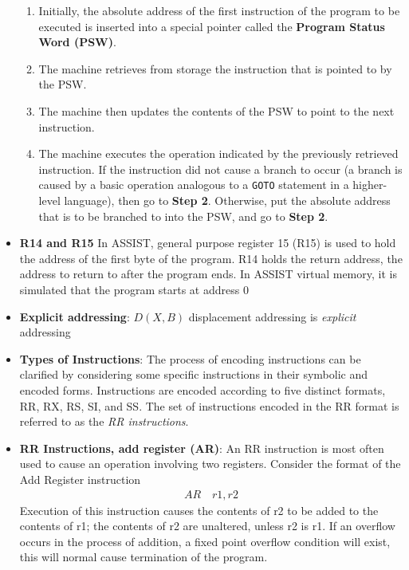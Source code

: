 \documentclass{report}
\begin{document}
\begin{itemize}
\begin{enumerate}
                         \item Initially, the absolute address of the first instruction of the program to be executed is inserted into a special pointer called the \textbf{Program Status Word (PSW)}.
                         \item The machine retrieves from storage the instruction that is pointed to by the PSW.
                         \item The machine then updates the contents of the PSW to point to the next instruction.
                         \item The machine executes the operation indicated by the previously retrieved instruction. If the instruction did not cause a branch to occur (a branch is caused by a basic operation analogous to a \texttt{GOTO} statement in a higher-level language), then go to \textbf{Step 2}. Otherwise, put the absolute address that is to be branched to into the PSW, and go to \textbf{Step 2}.
                    \end{enumerate}
                    \bigbreak \noindent 
                \item \textbf{R14 and R15} In ASSIST, general purpose register 15 (R15) is used to hold the address of the first byte of the program. R14 holds the return address, the address to return to after the program ends. In ASSIST virtual memory, it is simulated that the program starts at address  0
                \item \textbf{Explicit addressing}: $D(X,B)$ displacement addressing is \textit{explicit} addressing
                \item \textbf{Types of Instructions}: The process of encoding instructions can be clarified by considering some specific instructions in their symbolic and encoded forms. Instructions are encoded according to five distinct formats, RR, RX, RS, SI, and SS. The set of instructions encoded in the RR format is referred to as the \textit{RR instructions}.
                \item \textbf{RR Instructions, add register (AR)}: An RR instruction is most often used to cause an operation involving two registers.
                    \bigbreak \noindent 
                    Consider the format of the Add Register instruction
                    \begin{align*}
                        AR \quad r1,r2
                    \end{align*}
                    Execution of this instruction causes the contents of r2 to be added to the contents of r1; the contents of r2 are unaltered, unless r2 is r1. If an overflow occurs in the process of addition, a fixed point overflow condition will exist, this will normal cause termination of the program.

\end{itemize}
\end{document}
